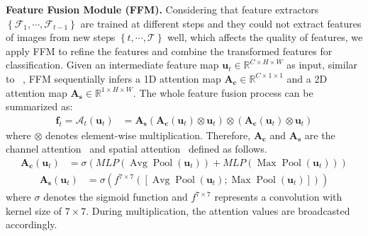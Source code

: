 \documentclass[letterpaper]{article} %
\begin{document}
\noindent\textbf{Feature Fusion Module (FFM).}\label{FFM}
Considering that feature extractors $\left\{\mathcal{F}_{1}, \cdots, \mathcal{F}_{t-1}\right\}$ are trained at different steps and they could not extract features of images from new steps $\left\{t, \cdots, \mathcal{T}\right\}$ well, which affects the quality of features, we apply FFM to refine the features and combine the transformed features for classification. Given an intermediate feature map $\boldsymbol{u}_{t} \in \mathbb{R}^{C \times H \times W}$ as input, similar to ~\cite{c0}, FFM sequentially infers a 1D attention map $\mathbf{A}_{\mathbf{c}} \in \mathbb{R}^{C \times 1 \times 1}$ and a 2D attention map $\mathbf{A}_{\mathbf{s}} \in \mathbb{R}^{1 \times H \times W}$. The whole feature fusion process can be summarized as:
\begin{equation}
\begin{aligned}
\boldsymbol{f}_{t}=\mathcal{A}_t(\boldsymbol{u}_{t}) &=\mathbf{A}_{\mathbf{s}}\left(\mathbf{A}_{\mathbf{c}}(\boldsymbol{u}_{t}) \otimes \boldsymbol{u}_{t}\right) \otimes \left(\mathbf{A}_{\mathbf{c}}(\boldsymbol{u}_{t}) \otimes \boldsymbol{u}_{t}\right)
\end{aligned} \label{e12}
\end{equation}
where $\otimes$ denotes element-wise multiplication. Therefore, $\mathbf{A}_{\mathbf{c}}$ and $\mathbf{A}_{\mathbf{s}}$ are the channel attention~\cite{c28, c0, e10} and spatial attention~\cite{c0, e11} defined as follows.
\begin{equation}
\begin{aligned}
\mathbf{A}_{\mathbf{c}}(\boldsymbol{u}_{t}) &=\sigma(M L P(\operatorname{Avg} \operatorname{Pool}(\boldsymbol{u}_{t}))+M L P(\operatorname{Max} \operatorname{Pool}(\boldsymbol{u}_{t})))
\end{aligned} \label{e13}
\end{equation}
\begin{equation}
\begin{aligned}
\mathbf{A}_{\mathbf{s}}(\boldsymbol{u}_{t}) &=\sigma\left(f^{7 \times 7}([\operatorname{Avg} \operatorname{Pool}(\boldsymbol{u}_{t}) ; \operatorname{Max} \operatorname{Pool}(\boldsymbol{u}_{t})])\right)
\end{aligned} \label{e14}
\end{equation}
where $\sigma$ denotes the sigmoid function and $f^{7 \times 7}$ represents a convolution with kernel size of $7 \times 7$. During multiplication, the attention values are broadcasted accordingly.
\end{document}
